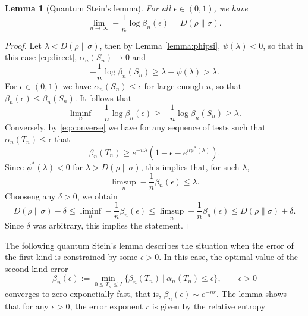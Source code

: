 \documentclass[12pt]{article}
\newtheorem{lemma}{Lemma}
\theoremstyle{definition}
\theoremstyle{remark}
\begin{document}
\begin{lemma}[Quantum Stein's lemma]\label{lemma:stein}\cite{hiai1991theproper,ogawa2000strong} For all $\epsilon\in (0,1)$, we have
\[
\lim_{n\to\infty} -\frac1n \log \beta_n(\epsilon)= D(\rho\|\sigma).
\]
\end{lemma}
\begin{proof} Let $\lambda<D(\rho\|\sigma)$, then by Lemma \ref{lemma:phipsi},
$\psi(\lambda)<0$, so that in this case \eqref{eq:direct}, $\alpha_n(S_n)\to 0$ and 
\[
-\frac1n\log \beta_n(S_n)\ge \lambda -\psi(\lambda)>\lambda.
\]
For $\epsilon\in (0,1)$ we have $\alpha_n(S_n)\le \epsilon$ for large enough $n$, so that 
$\beta_n(\epsilon)\le \beta_n(S_n)$. It follows that
\[
\liminf_n -\frac1n\log\beta_n(\epsilon)\ge -\frac1n\log \beta_n(S_n)\ge \lambda.
\]
Conversely, by \eqref{eq:converse} we have for any sequence of
tests such that $\alpha_n(T_n)\le \epsilon$ that
\[
\beta_n(T_n)\ge e^{-n\lambda}(1-\epsilon-e^{n\psi^*(\lambda)}).
\]
Since $\psi^*(\lambda)<0$ for  $\lambda>D(\rho\|\sigma)$, this implies that, for such
$\lambda$,
\[
\limsup_n -\frac1n\beta_n(\epsilon)\le \lambda.
\]
Chooseng any $\delta>0$, we obtain
\[
D(\rho\|\sigma)-\delta\le \liminf_n-\frac1n\beta_n(\epsilon)\le
\limsup_n-\frac1n\beta_n(\epsilon)\le D(\rho\|\sigma)+\delta.
\]
Since $\delta$ was arbitrary, this implies the statement.

\end{proof}


The following quantum Stein's
lemma describes the situation when the error of the first kind is constrained by some
$\epsilon>0$. In this case, the optimal value of the second kind error
 \[
\beta_n(\epsilon):=\min_{0\le T_n\le I}\{\beta_n(T_n)\ | \ \alpha_n(T_n)\le
\epsilon\},\qquad \epsilon>0
\]
converges to zero exponetially fast, that is, $\beta_n(\epsilon)\sim e^{-nr}$. The lemma
shows that for any $\epsilon>0$, the error exponent $r$ is given by the relative entropy
\end{document}
